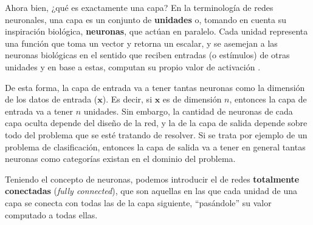 \documentclass[../../main.tex]{subfiles}
\begin{document}
Ahora bien, ¿qué es exactamente una capa? En la terminología de redes neuronales, una capa
es un conjunto de \textbf{unidades} o, tomando en cuenta su inspiración biológica,
\textbf{neuronas}, que actúan en paralelo. Cada unidad representa una función que toma un
vector y retorna un escalar, y se asemejan a las neuronas biológicas en el sentido que
reciben entradas (o estímulos) de otras unidades y en base a estas, computan su propio
valor de activación \cite{deep-learning}.

De esta forma, la capa de entrada va a tener tantas neuronas como la dimensión de los
datos de entrada (\(\bm{x}\)). Es decir, si \(\bm{x}\) es de dimensión \(n\), entonces la
capa de entrada va a tener \(n\) unidades. Sin embargo, la cantidad de neuronas de cada
capa oculta depende del diseño de la red, y la de la capa de salida depende sobre todo del
problema que se esté tratando de resolver. Si se trata por ejemplo de un problema de
clasificación, entonces la capa de salida va a tener en general tantas neuronas como
categorías existan en el dominio del problema.

Teniendo el concepto de neuronas, podemos introducir el de redes \textbf{totalmente
conectadas} (\textit{fully connected}), que son aquellas en las que cada unidad de una
capa se conecta con todas las de la capa siguiente, ``pasándole'' su valor computado
a todas ellas.
\end{document}
